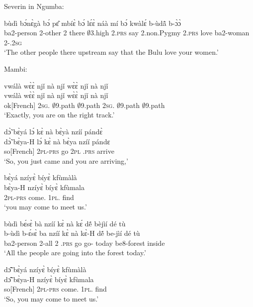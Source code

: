 \noindent Severin in Ngumba:

\begin{exe}[(C234)] 
\exC\label{131}
  \gll bùdì bɔ́nɛ̀gà bɔ́ pɛ̂ mbíɛ̀ bɔ́ lɛ́ɛ̀ náà mí bɔ́ kwàlɛ́ b-ùdã̂ b-ɔ̀ɔ̀ \\
         ba2-person 2-other 2 there $\emptyset$3.high 2.\textsc{prs} say {\COMP} 2.non.Pygmy 2.\textsc{prs} love ba2-woman 2-{\POSS}.2\textsc{sg} \\
    \trans `The other people there upstream say that the Bulu love your women.'
\end{exe}

\noindent Mambi:

\begin{exe}[(C234)] 
\exC\label{132}
  \glll  vwálà wɛ̀ɛ̀ njǐ nà njǐ wɛ̀ɛ̀ njǐ nà njǐ\\
        vwálà wɛ̀ɛ̀ njǐ nà njǐ wɛ̀ɛ̀ njǐ nà njǐ\\
          ok[French] 2\textsc{sg}.{\COP} $\emptyset$9.path {\CONJ} $\emptyset$9.path 2\textsc{sg}.{\COP} $\emptyset$9.path {\CONJ} $\emptyset$9.path\\
    \trans `Exactly, you are on the right track.'
 
\exC\label{133} 
  \glll  dɔ̃̀ bɛ̀yá lɔ́ kɛ̀ nà bɛ̀yà nzíí pándɛ̀ \\
          dɔ̃̀ bɛ̀ya-H lɔ́ kɛ̀ nà bɛ̀ya nzíí pándɛ \\
          so[French] 2\textsc{pl}-\textsc{prs} {\RETRO}  go {\CONJ} 2\textsc{pl} {\PROG}.\textsc{prs} arrive \\
    \trans `So, you just came and you are arriving,'
 
\exC\label{134}
  \glll  bɛ̀yá nzíyɛ̀ bíyɛ̀ kfùmàlà \\
         bɛ̀ya-H nzíyɛ̀ bíyɛ̀ kfùmala \\
         2\textsc{pl}-\textsc{prs}  come.{\SBJV}  1\textsc{pl}.{\OBJ} find  \\
    \trans `you may come to meet us.'
 
\exC\label{135} 
  \glll  bùdì bɛ́sɛ̀ bà nzíí kɛ̀ nà kɛ́ dẽ́ bèjìí dé tù\\
       b-ùdì b-ɛ́sɛ̀ ba nzíí kɛ̀ nà kɛ̀-H dẽ́ be-jìí dé tù\\
         ba2-person 2-all 2 {\PROG}.\textsc{prs} go {\CONJ} go-{\R} today be8-forest {\LOC} inside\\
    \trans `All the people are going into the forest today.'
 
\exC\label{136}
  \glll  dɔ̃̂ bɛ̀yá nzíyɛ̀ bíyɛ̀ kfùmàlà \\
        dɔ̃̂ bɛ̀ya-H nzíyɛ̀ bíyɛ̀ kfùmala \\
        so[French] 2\textsc{pl}-\textsc{prs}  come.{\SBJV}  1\textsc{pl}.{\OBJ} find   \\
    \trans `So, you may come to meet us.'
 

\end{exe}
